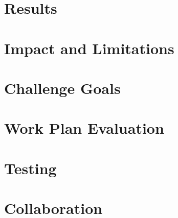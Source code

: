 \documentclass[a4paper, 12pt]{article}
\begin{document}
\section*{Results}


\section*{Impact and Limitations}

\section*{Challenge Goals}

\section*{Work Plan Evaluation}

\section*{Testing}

\section*{Collaboration}
\end{document}
